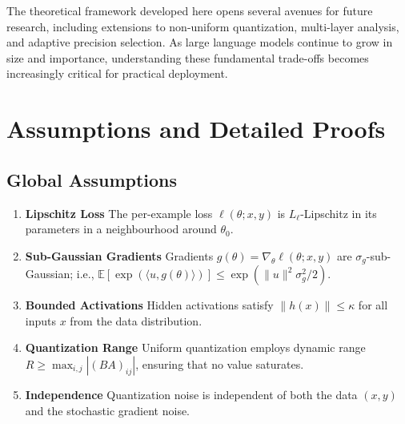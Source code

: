 \documentclass[10pt,twocolumn]{article}
\newcommand{\E}{\mathbb{E}}
\begin{document}
The theoretical framework developed here opens several avenues for future research, including extensions to non-uniform quantization, multi-layer analysis, and adaptive precision selection. As large language models continue to grow in size and importance, understanding these fundamental trade-offs becomes increasingly critical for practical deployment.

\appendix
\section{Assumptions and Detailed Proofs}

\subsection{Global Assumptions}
\begin{enumerate}
    \item \textbf{Lipschitz Loss}\label{ass:lipschitz} The per-example loss $\ell(\theta; x, y)$ is $L_{\ell}$-Lipschitz in its parameters in a neighbourhood around $\theta_0$.
    \item \textbf{Sub-Gaussian Gradients}\label{ass:subgaussian} Gradients $g(\theta)=\nabla_{\theta} \ell(\theta; x, y)$ are $\sigma_g$-sub-Gaussian; i.e., $\E[\exp(\langle u, g(\theta)\rangle)] \le \exp(\|u\|^2 \sigma_g^2 / 2)$.
    \item \textbf{Bounded Activations}\label{ass:activation} Hidden activations satisfy $\|h(x)\| \le \kappa$ for all inputs $x$ from the data distribution.
    \item \textbf{Quantization Range}\label{ass:range} Uniform quantization employs dynamic range $R \ge \max_{i,j}|(BA)_{ij}|$, ensuring that no value saturates.
    \item \textbf{Independence}\label{ass:indep} Quantization noise is independent of both the data $(x,y)$ and the stochastic gradient noise.
\end{enumerate}
\end{document}
